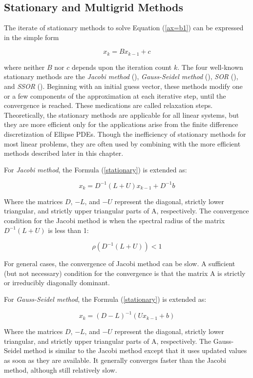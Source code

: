 \subsection{Stationary and Multigrid Methods}

The iterate of stationary methods to solve Equation (\ref{ax=b1}) can be expressed in the simple form

\begin{equation}
\label{stationary}
x_k = Bx_{k-1}+c
\end{equation}

where neither $B$ nor $c$ depends upon the iteration count $k$. The four well-known stationary methods are the \textit{Jacobi method} (\cite{yang2014acceleration}), \textit{Gauss-Seidel method} (\cite{yoon1988lower}), \textit{SOR} (\cite{adams1982multi}), and \textit{SSOR} (\cite{axelsson1972generalized}). Beginning with an initial guess vector, these methods modify one or a few components of the approximation at each iterative step, until the convergence is reached. These medications are called relaxation steps. Theoretically, the stationary methods are applicable for all linear systems, but they are more efficient only for the applications arise from the finite difference discretization of Ellipse PDEs. Though the inefficiency of stationary methods for most linear problems, they are often used by combining with the more efficient methods described later in this chapter.

For \textit{Jacobi method}, the Formula (\ref{stationary}) is extended as:

\[x_k = D^{-1}(L+U)x_{k-1}+D^{-1}b\]

Where the matrices $D$, $-L$, and $-U$ represent the diagonal, strictly lower triangular, and strictly upper triangular parts of A, respectively. The convergence condition for the Jacobi method is when the spectral radius of the matrix $D^{-1}(L+U)$ is less than 1:

\[\rho(D^{-1}(L+U)) < 1\]

For general cases, the convergence of Jacobi method can be slow. A sufficient (but not necessary) condition for the convergence is that the matrix A is strictly or irreducibly diagonally dominant.

For \textit{Gauss-Seidel method}, the Formula (\ref{stationary}) is extended as:

\[x_k = (D-L)^{-1}(Ux_{k-1}+b)\]

Where the matrices $D$, $-L$, and $-U$ represent the diagonal, strictly lower triangular, and strictly upper triangular parts of A, respectively. The Gauss-Seidel method is similar to the Jacobi method except that it uses updated values as soon as they are available. It generally converges faster than the Jacobi method, although still relatively slow. 

